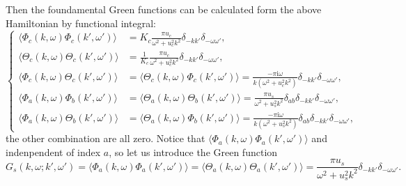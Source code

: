 \documentclass[10pt]{extarticle}
\newcommand{\ii}{\mathrm{i}}
\begin{document}
Then the foundamental Green functions can be calculated form the above Hamiltonian by functional integral: 
\[\left\{
\begin{aligned}
	\langle \Phi_c(k,\omega)\Phi_c(k',\omega')\rangle&=K_c\frac{\pi u_c}{\omega^2+u_c^2k^2}\delta_{-kk'}\delta_{-\omega\omega'},\\
	\langle \Theta_c(k,\omega)\Theta_c(k',\omega')\rangle&=\frac{1}{K_c}\frac{\pi u_c}{\omega^2+u_c^2k^2}\delta_{-kk'}\delta_{-\omega\omega'},\\
	\langle \Phi_c(k,\omega)\Theta_c(k',\omega')\rangle&=\langle \Theta_c(k,\omega)\Phi_c(k',\omega')\rangle=\frac{-\pi\ii\omega}{k(\omega^2+u_c^2k^2)}\delta_{-kk'}\delta_{-\omega\omega'},\\
	\langle \Phi_a(k,\omega)\Phi_b(k',\omega')\rangle&=\langle \Theta_a(k,\omega)\Theta_b(k',\omega')\rangle=\frac{\pi u_s}{\omega^2+u_s^2k^2}\delta_{ab}\delta_{-kk'}\delta_{-\omega\omega'},\\
	\langle \Phi_a(k,\omega)\Theta_b(k',\omega')\rangle&=\langle \Theta_a(k,\omega)\Phi_b(k',\omega')\rangle=\frac{-\pi\ii\omega}{k(\omega^2+u_s^2k^2)}\delta_{ab}\delta_{-kk'}\delta_{-\omega\omega'},
\end{aligned}
\right.
\]
the other combination are all zero. Notice that $\langle \Phi_a(k,\omega)\Phi_a(k',\omega')\rangle$ and indenpendent of index $a$, so let us introduce the Green function
\[
	G_s(k,\omega;k',\omega')=\langle \Phi_a(k,\omega)\Phi_a(k',\omega')\rangle=\langle \Theta_a(k,\omega)\Theta_a(k',\omega')\rangle=\frac{\pi u_s}{\omega^2+u_s^2k^2}\delta_{-kk'}\delta_{-\omega\omega'}.
\]
\end{document}
